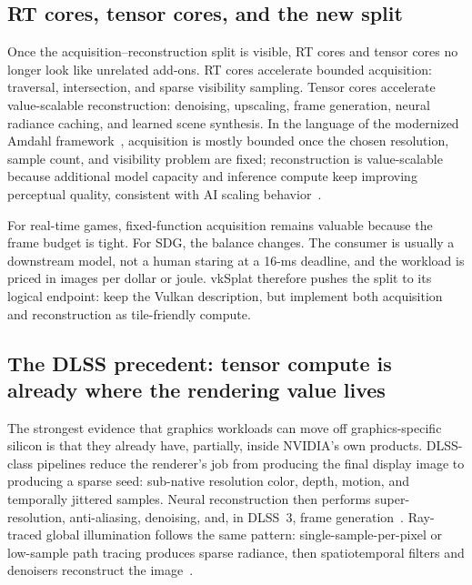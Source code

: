 \documentclass[10pt,journal]{IEEEtran}
\begin{document}
\subsection{RT cores, tensor cores, and the new split}

Once the acquisition--reconstruction split is visible, RT cores and
tensor cores no longer look like unrelated add-ons. RT cores accelerate
bounded acquisition: traversal, intersection, and sparse visibility
sampling. Tensor cores accelerate value-scalable reconstruction:
denoising, upscaling, frame generation, neural radiance caching, and
learned scene synthesis. In the language of the modernized Amdahl
framework~\cite{lu2026amdahl}, acquisition is mostly bounded once the
chosen resolution, sample count, and visibility problem are fixed;
reconstruction is value-scalable because additional model capacity and
inference compute keep improving perceptual quality, consistent with AI
scaling behavior~\cite{kaplan2020,lu2026}.

For real-time games, fixed-function acquisition remains valuable because
the frame budget is tight. For SDG, the balance changes. The consumer is
usually a downstream model, not a human staring at a 16-ms deadline, and
the workload is priced in images per dollar or joule. vkSplat therefore
pushes the split to its logical endpoint: keep the Vulkan description,
but implement both acquisition and reconstruction as tile-friendly
compute.

\subsection{The DLSS precedent: tensor compute is already where the
rendering value lives}
\label{sec:dlss}

The strongest evidence that graphics workloads can move off
graphics-specific silicon is that they already have, partially, inside
NVIDIA's own products. DLSS-class pipelines reduce the renderer's job
from producing the final display image to producing a sparse seed:
sub-native resolution color, depth, motion, and temporally jittered
samples. Neural reconstruction then performs super-resolution,
anti-aliasing, denoising, and, in DLSS~3, frame
generation~\cite{nvidia-dlss,liu2020nsrr,edelsten2019dlss,nvidia-dlss3}.
Ray-traced global illumination follows the same pattern:
single-sample-per-pixel or low-sample path tracing produces sparse
radiance, then spatiotemporal filters and denoisers reconstruct the
image~\cite{schied2017svgf,chaitanya2017interactive,nvidia-nrd,bitterli2020restir}.
\end{document}
